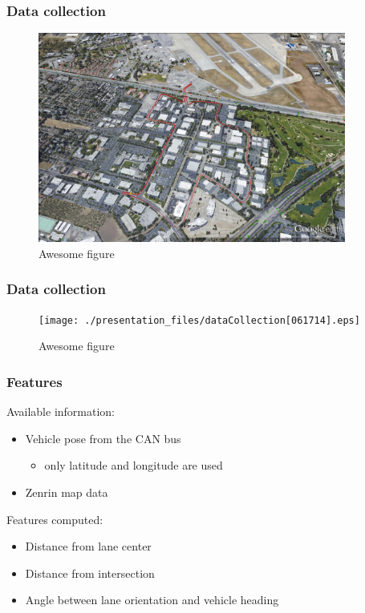 \documentclass{beamer}
\begin{document}
\begin{frame}
\frametitle{Data collection}
	
	 \begin{figure}
 		\centering
    	\includegraphics[width =
    	0.9\textwidth]{./presentation_files/dataCollection[061714].jpg}
    	\caption{Awesome figure}
	\end{figure}
	
\end{frame}

\begin{frame}
\frametitle{Data collection}
	
	 \begin{figure}
 		\centering
    	\texttt{[image: ./presentation\_files/dataCollection[061714].eps]}
    	\caption{Awesome figure}
	\end{figure}
	
\end{frame}

\begin{frame}
\frametitle{Features}
	Available information:
	\begin{itemize}
	\item Vehicle pose from the CAN bus
	\begin{itemize}\item only latitude and longitude are used \end{itemize}
	\item Zenrin map data
	\end{itemize}
	Features computed:
	\begin{itemize}
	   \item Distance from lane center
	   \item Distance from intersection
	   \item Angle between lane orientation and vehicle heading
	\end{itemize}
\end{frame}
\end{document}
